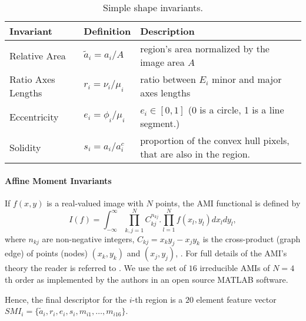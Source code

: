 \documentclass[a4paper,11pt]{article}
\begin{document}
\begin{table}[!ht]
\begin{center}
\begin{tabular}{|l||l|l|}
\hline
Invariant & Definition & Description\\
\hline
\hline
Relative Area & $\tilde{a}_i = {a_i}/{A}$ & region's area normalized by the image area $A$\\
\hline
Ratio Axes Lengths & $r_i = {\nu_i}/{\mu_i}$& ratio between $E_i$ minor and major axes lengths\\
\hline
Eccentricity &$e_i = \phi_i/\mu_i$& $e_i \in [0,1]$ (0 is a circle, 1 is a line segment.)\\
\hline
Solidity & $s_i = {a_i}/{a_i^c} $ & proportion of the convex hull pixels, that are also in the region. \\
\hline
\end{tabular}
\end{center}
\vspace{-20pt}
\caption{\small Simple shape invariants.} \label{tab:ssi}
  \vspace{-20pt}
\end{table}

\paragraph{Affine Moment Invariants}
 
If $f(x,y)$ is a real-valued image with $N$ points, the AMI functional is defined by
\begin{equation}
I(f) = \int_{-\infty}^{\infty} \prod_{k,j=1}^{N}C_{kj}^{n_{kj}} . \prod_{l=1}^{N}f(x_l, y_l)dx_ldy_l,
\end{equation}
where $n_{kj}$ are non-negative integers, $C_{kj} =x_ky_j - x_jy_k$ is the cross-product (graph edge) of points (nodes) $(x_k, y_k)$ and $(x_j, y_j)$, \cite{SukF04}. For full details of the AMI's theory the reader is referred to \cite{Flusser09a}.
We use the set of $16$ irreducible AMIs of $N=4$th order as implemented by the authors in an open source MATLAB software.%

Hence, the final descriptor for the $i$-th region is a $20$ element feature vector $SMI_i = \{\tilde{a}_i, r_i, e_i, s_i, m_{i1}, \ldots, m_{i16}\}$. 
\end{document}
